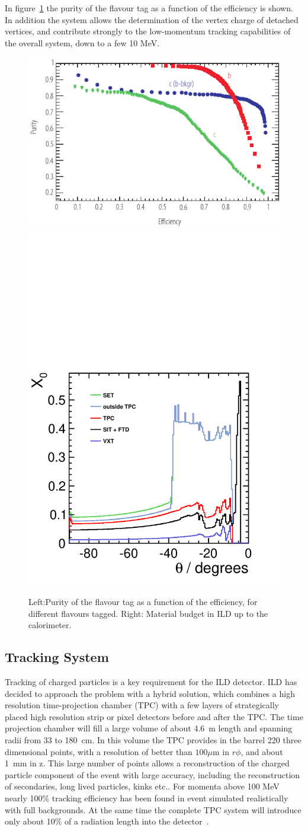 \documentclass[%
 amsmath,amssymb,
 aps,
]{revtex4-1}
\begin{document}
In figure~\ref{fig-btag} the purity of the flavour tag as a function of the efficiency is shown. In addition the system allows the determination of the vertex charge of detached vertices, and contribute strongly to the low-momentum tracking capabilities of the overall system, down to a few 10 MeV. 
\begin{figure}
    \centering
    \includegraphics[width=0.45\hsize]{figures/FlavourTagPurities_Zpeak_DCR-eps-converted-to.pdf}
    \includegraphics[width=0.35\hsize]{figures/material-budget-new.pdf}
    \caption{Left:Purity of the flavour tag as a function of the efficiency, for different flavours tagged. Right: Material budget in ILD up to the calorimeter.}
    \label{fig-btag}
\end{figure}  

\subsection{Tracking System}

Tracking of charged particles is a key requirement for the ILD detector. ILD has decided to approach the problem with a hybrid solution, which combines a high resolution time-projection chamber (TPC) with a few layers of strategically placed high resolution strip or pixel detectors before and after the TPC. 
The time projection chamber will fill a large volume of about 4.6~m length and spanning radii from 33 to 180~cm. In this volume the TPC provides in the barrel 220 three dimensional points, with a resolution of better than $100 \mu$m in $r \phi$, and about 1~mm in z. This large number of points allows a reconstruction of the charged particle component of the event with large accuracy, including the reconstruction of secondaries, long lived particles, kinks etc.. For momenta above 100 MeV nearly 100\% tracking efficiency has been found in event simulated realistically with full backgrounds. At the same time the complete TPC system will introduce only about 10\% of a radiation length into the detector~\cite{Diener:2012mc}. 
\end{document}
